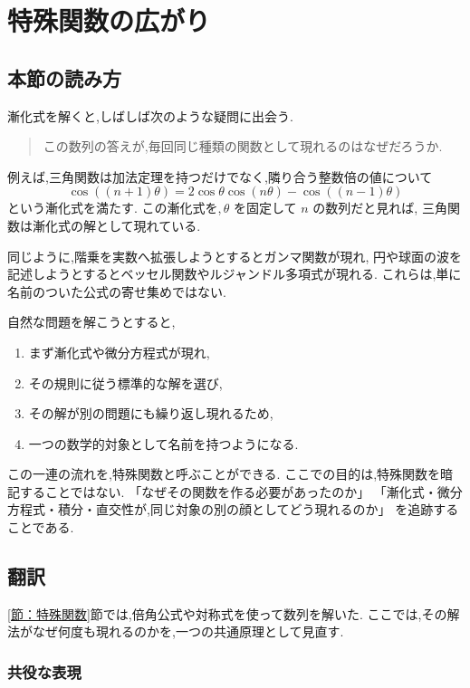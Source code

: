 
\section{特殊関数の広がり}


\subsection*{本節の読み方}

漸化式を解くと,しばしば次のような疑問に出会う.

\begin{quote}
  この数列の答えが,毎回同じ種類の関数として現れるのはなぜだろうか.
\end{quote}

例えば,三角関数は加法定理を持つだけでなく,隣り合う整数倍の値について
\[
  \cos((n+1)\theta)
  =2\cos\theta\cos(n\theta)-\cos((n-1)\theta)
\]
という漸化式を満たす.
この漸化式を,\,$\theta$ を固定して $n$ の数列だと見れば,
三角関数は漸化式の解として現れている.

同じように,階乗を実数へ拡張しようとするとガンマ関数が現れ,
円や球面の波を記述しようとするとベッセル関数やルジャンドル多項式が現れる.
これらは,単に名前のついた公式の寄せ集めではない.

自然な問題を解こうとすると,
\begin{enumerate}
  \item まず漸化式や微分方程式が現れ,
  \item その規則に従う標準的な解を選び,
  \item その解が別の問題にも繰り返し現れるため,
  \item 一つの数学的対象として名前を持つようになる.
\end{enumerate}

この一連の流れを,特殊関数と呼ぶことができる.
ここでの目的は,特殊関数を暗記することではない.
「なぜその関数を作る必要があったのか」
「漸化式・微分方程式・積分・直交性が,同じ対象の別の顔としてどう現れるのか」
を追跡することである.

\subsection{翻訳}

\ref{節：特殊関数}節では,倍角公式や対称式を使って数列を解いた.
ここでは,その解法がなぜ何度も現れるのかを,一つの共通原理として見直す.

\subsubsection{共役な表現}

